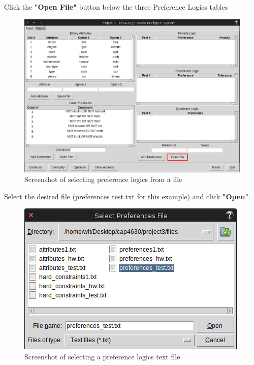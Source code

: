 \documentclass[12pt]{report}
\begin{document}
\begin{description}[leftmargin=4em]
\item [Step 1:] Click the \textbf{"Open File"} button below the three Preference Logics tables
\begin{figure}[H]
\begin{center}
\includegraphics[scale=0.3,trim=1cm 1cm 1cm 1cm]{input_preferences}
\caption{Screenshot of selecting preference logics from a file}
\end{center}
\end{figure}
\vspace{-2.5em}
\item [Step 2:] Select the desired file (preferences$\_$test.txt for this example) and click \textbf{"Open"}.
\begin{figure}[H]
\begin{center}
\includegraphics[scale=0.3,trim=1cm 1cm 1cm 1cm]{select_preferences}
\caption{Screenshot of selecting a preference logics text file}

\end{center}
\end{figure}
\end{description}
\end{document}

